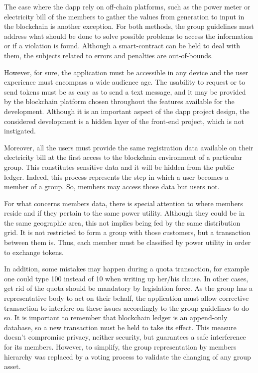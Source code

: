 The case where the \gls{dapp} rely on off-chain platforms, such as the power meter or electricity bill of the members to gather the values from generation to input in the blockchain is another exception.
For both methods, the group guidelines must address what should be done to solve possible problems to access the information or if a violation is found.
Although a smart-contract can be held to deal with them, the subjects related to errors and penalties are out-of-bounds.

However, for sure, the application must be accessible in any device and the user experience must encompass a wide audience age.
The usability to request or to send tokens must be as easy as to send a text message,
and it may be provided by the blockchain platform chosen throughout the features available for the development.
Although it is an important aspect of the \gls{dapp} project design, the considered development is a hidden layer of the front-end project, which is not instigated.

Moreover, all the users must provide the same registration data available on their electricity bill at the first access to the blockchain environment of a particular group.
This constitutes sensitive data and it will be hidden from the public ledger.
Indeed, this process represents the step in which a user becomes a member of a group.
So, members may access those data but users not.

For what concerns members data, there is special attention to where members reside and if they pertain to the same power utility.
Although they could be in the same geographic area, this not implies being fed by the same distribution grid.
It is not restricted to form a group with those customers, but a transaction between them is.
Thus, each member must be classified by power utility in order to exchange tokens.

In addition, some mistakes may happen during a quota transaction,
for example one could type 100 instead of 10 when writing up her/his clause.
In other cases, get rid of the quota should be mandatory by legislation force.
As the group has a representative body to act on their behalf,
the application must allow corrective transaction to interfere on these issues accordingly to the group guidelines to do so.
It is important to remember that blockchain ledger is an append-only database, so a new transaction must be held to take its effect.
This measure doesn't compromise privacy, neither security, but guarantees a safe interference for its members.
However, to simplify, the group representation by members hierarchy was replaced by a voting process to validate the changing of any group asset.

